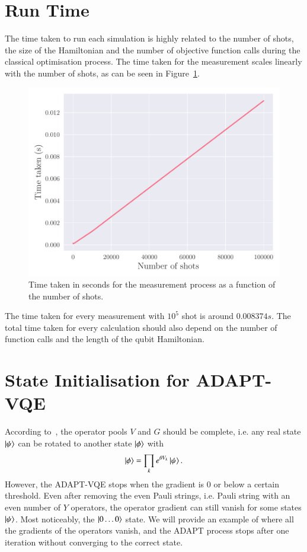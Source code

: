 \section{Run Time}
\label{sec:runtime}
The time taken to run each simulation is highly related to the number of shots, the size of the Hamiltonian and the number of objective function calls during the classical optimisation process. The time taken for the measurement scales linearly with the number of shots, as can be seen in Figure~\ref{fig:timed_shots}.
\begin{figure}[ht]
	\centering
	\includegraphics[width=0.7\linewidth]{image/time_vs_shots.pdf}
	\caption{Time taken in seconds for the measurement process as a function of the number of shots.}
	\label{fig:timed_shots}
\end{figure}

The time taken for every measurement with $ 10^5 $ shot is around $ 0.008374 s$. The total time taken for every calculation should also depend on the number of function calls and the length of the qubit Hamiltonian. 



\section{State Initialisation for ADAPT-VQE}
\label{sec:initstate}
According to~\cite{tang2021}, the operator pools $V$ and $G$ should be complete, i.e. any real state $ \ket{\psi} $ can be rotated to another state $ \ket{ \phi} $ with
\begin{equation}
	\ket{\phi} = \prod_{k} e^{\theta V_k} \ket{\psi}.
\end{equation}
However, the ADAPT-VQE stops when the gradient is $ 0 $ or below a certain threshold. Even after removing the even Pauli strings, i.e. Pauli string with an even number of $ Y $ operators, the operator gradient can still vanish for some states $ \ket{\psi}  $. Most noticeably, the $ \ket{0 \ldots 0} $ state. We will provide an example of where all the gradients of the operators vanish, and the ADAPT process stops after one iteration without converging to the correct state. 

